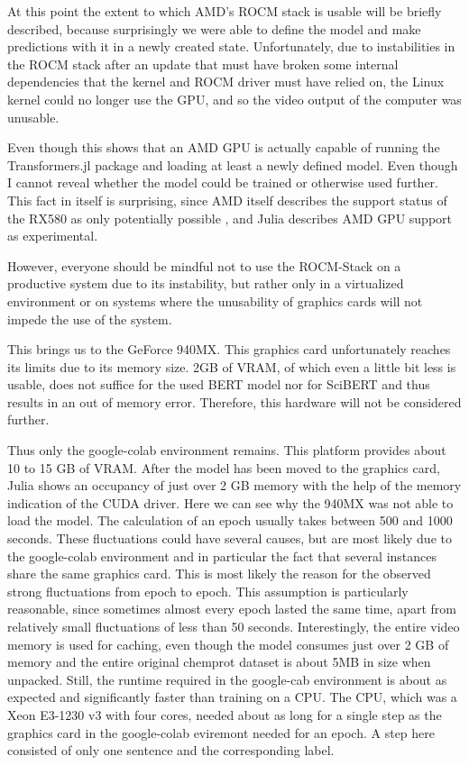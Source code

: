 At this point the extent to which AMD's ROCM stack \cite{Devices2021} is usable will be briefly described, because surprisingly we were able to define the model and make predictions with it in a newly created state. Unfortunately, due to instabilities in the ROCM stack after an update that must have broken some internal dependencies that the kernel and ROCM driver must have relied on, the Linux kernel could no longer use the GPU, and so the video output of the computer was unusable.

Even though this shows that an AMD GPU is actually capable of running the Transformers.jl \cite{Cheng2020} package and loading at least a newly defined model. Even though I cannot reveal whether the model could be trained or otherwise used further. This fact in itself is surprising, since AMD itself describes the support status of the RX580 as only potentially possible \cite{Devices2021}, and Julia describes AMD GPU support as experimental. \cite{Besard2021}

However, everyone should be mindful not to use the ROCM-Stack on a productive system due to its instability, but rather only in a virtualized environment or on systems where the unusability of graphics cards will not impede the use of the system.   

This brings us to the GeForce 940MX. This graphics card unfortunately reaches its limits due to its memory size. 2GB of VRAM, of which even a little bit less is usable, does not suffice for the used BERT model nor for SciBERT and thus results in an out of memory error. Therefore, this hardware will not be considered further. 

Thus only the google-colab environment remains. 
This platform provides about 10 to 15 GB of VRAM. After the model has been moved to the graphics card, Julia shows an occupancy of just over 2 GB memory with the help of the memory indication of the CUDA driver. Here we can see why the 940MX was not able to load the model. The calculation of an epoch usually takes between 500 and 1000 seconds. These fluctuations could have several causes, but are most likely due to the google-colab environment and in particular the fact that several instances share the same graphics card. This is most likely the reason for the observed strong fluctuations from epoch to epoch. This assumption is particularly reasonable, since sometimes almost every epoch lasted the same time, apart from relatively small fluctuations of less than 50 seconds. Interestingly, the entire video memory is used for caching, even though the model consumes just over 2 GB of memory and the entire original chemprot dataset is about 5MB in size when unpacked. Still, the runtime required in the google-cab environment is about as expected and significantly faster than training on a CPU. The CPU, which was a Xeon E3-1230 v3 with four cores, needed about as long for a single step as the graphics card in the google-colab eviremont needed for an epoch. A step here consisted of only one sentence and the corresponding label.
 

